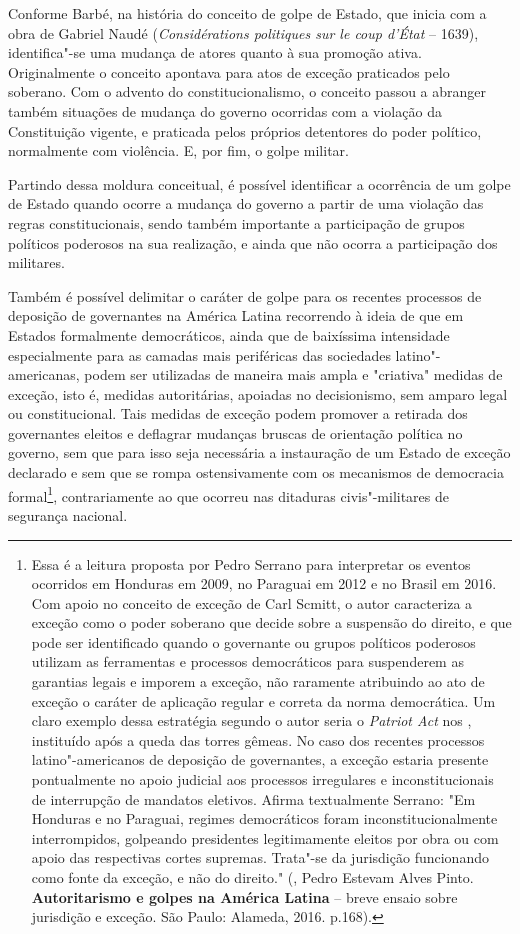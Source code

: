 Conforme Barbé, na história do conceito de golpe de Estado, que inicia
com a obra de Gabriel Naudé (\emph{Considérations politiques sur le coup
d'État} -- 1639), identifica"-se uma mudança de atores quanto à sua
promoção ativa. Originalmente o conceito apontava para atos de exceção
praticados pelo soberano. Com o advento do constitucionalismo, o
conceito passou a abranger também situações de mudança do governo
ocorridas com a violação da Constituição vigente, e praticada pelos
próprios detentores do poder político, normalmente com violência. E, por
fim, o golpe militar.

Partindo dessa moldura conceitual, é possível identificar a ocorrência
de um golpe de Estado quando ocorre a mudança do governo a partir de uma
violação das regras constitucionais, sendo também importante a
participação de grupos políticos poderosos na sua realização, e ainda
que não ocorra a participação dos militares.

Também é possível delimitar o caráter de golpe para os recentes
processos de deposição de governantes na América Latina recorrendo à
ideia de que em Estados formalmente democráticos, ainda que de
baixíssima intensidade especialmente para as camadas mais periféricas
das sociedades latino"-americanas, podem ser utilizadas de maneira mais
ampla e "criativa" medidas de exceção, isto é, medidas autoritárias,
apoiadas no decisionismo, sem amparo legal ou constitucional. Tais
medidas de exceção podem promover a retirada dos governantes eleitos e
deflagrar mudanças bruscas de orientação política no governo, sem que
para isso seja necessária a instauração de um Estado de exceção
declarado e sem que se rompa ostensivamente com os mecanismos de
democracia formal\footnote{Essa é a leitura proposta por Pedro Serrano
  para interpretar os eventos ocorridos em Honduras em 2009, no Paraguai
  em 2012 e no Brasil em 2016. Com apoio no conceito de exceção de Carl
  Scmitt, o autor caracteriza a exceção como o poder soberano que decide
  sobre a suspensão do direito, e que pode ser identificado quando o
  governante ou grupos políticos poderosos utilizam as ferramentas e
  processos democráticos para suspenderem as garantias legais e imporem
  a exceção, não raramente atribuindo ao ato de exceção o caráter de
  aplicação regular e correta da norma democrática. Um claro exemplo
  dessa estratégia segundo o autor seria o \emph{Patriot Act} nos ,
  instituído após a queda das torres gêmeas. No caso dos recentes
  processos latino"-americanos de deposição de governantes, a exceção
  estaria presente pontualmente no apoio judicial aos processos
  irregulares e inconstitucionais de interrupção de mandatos eletivos.
  Afirma textualmente Serrano: "Em Honduras e no Paraguai, regimes
  democráticos foram inconstitucionalmente interrompidos, golpeando
  presidentes legitimamente eleitos por obra ou com apoio das
  respectivas cortes supremas. Trata"-se da jurisdição funcionando como
  fonte da exceção, e não do direito." (, Pedro Estevam Alves
  Pinto. \textbf{Autoritarismo e golpes na América Latina} -- breve
  ensaio sobre jurisdição e exceção. São Paulo: Alameda, 2016. p.168).},
contrariamente ao que ocorreu nas ditaduras civis"-militares de segurança
nacional.

